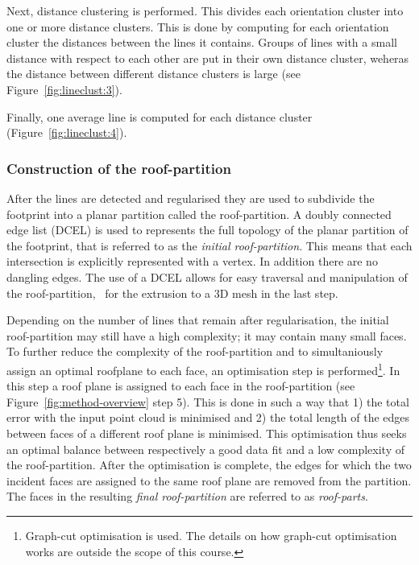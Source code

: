 Next, distance clustering is performed.
This divides each orientation cluster into one or more distance clusters.
This is done by computing for each orientation cluster the distances between the lines it contains.
Groups of lines with a small distance with respect to each other are put in their own distance cluster, weheras the distance between different distance clusters is large (see Figure~\ref{fig:lineclust:3}).

Finally, one average line is computed for each distance cluster (Figure~\ref{fig:lineclust:4}).

\subsubsection{Construction of the roof-partition}
After the lines are detected and regularised they are used to subdivide the footprint into a planar partition called the roof-partition.
A doubly connected edge list (DCEL) is used to represents the full topology of the planar partition of the footprint, that is referred to as the \emph{initial roof-partition}.
This means that each intersection is explicitly represented with a vertex.
In addition there are no dangling edges.
The use of a DCEL allows for easy traversal and manipulation of the roof-partition, \eg\ for the extrusion to a 3D mesh in the last step.


Depending on the number of lines that remain after regularisation, the initial roof-partition may still have a high complexity; it may contain many small faces.
To further reduce the complexity of the roof-partition and to simultaniously assign an optimal roofplane to each face, an optimisation step is performed\footnote{Graph-cut optimisation is used. The details on how graph-cut optimisation works are outside the scope of this course.}.
In this step a roof plane is assigned to each face in the roof-partition (see Figure~\ref{fig:method-overview} step 5).
This is done in such a way that 1) the total error with the input point cloud is minimised and 2) the total length of the edges between faces of a different roof plane is minimised.
This  optimisation thus seeks an optimal balance between respectively a good data fit and a low complexity of the roof-partition.
After the optimisation is complete, the edges for which the two incident faces are assigned to the same roof plane are removed from the partition.
The faces in the resulting \emph{final roof-partition} are referred to as \emph{roof-parts}.

